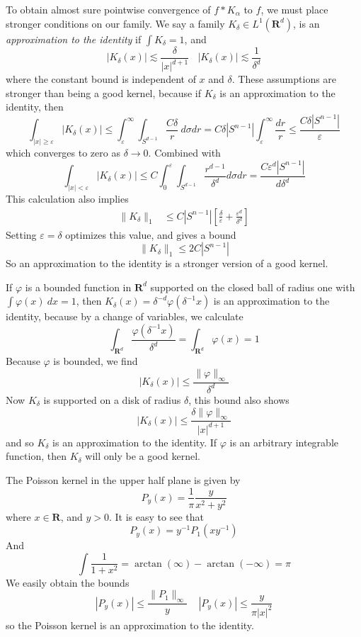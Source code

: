 To obtain almost sure pointwise convergence of $f * K_\alpha$ to $f$, we must place stronger conditions on our family. We say a family $K_\delta \in L^1(\mathbf{R}^d)$, is an \emph{approximation to the identity} if $\int K_\delta = 1$, and
%
\[ |K_\delta(x)| \lesssim \frac{\delta}{|x|^{d+1}}\ \ \ \ |K_\delta(x)| \lesssim \frac{1}{\delta^d} \]
%
where the constant bound is independent of $x$ and $\delta$. These assumptions are stronger than being a good kernel, because if $K_\delta$ is an approximation to the identity, then
%
\[ \int_{|x| \geq \varepsilon} |K_\delta(x)| \leq \int_\varepsilon^\infty \int_{S^{d-1}} \frac{C \delta}{r}\ d\sigma dr = C \delta |S^{n-1}| \int_\varepsilon^\infty \frac{dr}{r} \leq \frac{C \delta |S^{n-1}|}{\varepsilon} \]
%
which converges to zero as $\delta \to 0$. Combined with
%
\[ \int_{|x| < \varepsilon} |K_\delta(x)| \leq C \int_0^\varepsilon \int_{S^{d-1}} \frac{r^{d-1}}{\delta^d} d\sigma dr = \frac{C \varepsilon^d |S^{n-1}|}{d \delta^d} \]
%
This calculation also implies
%
\begin{align*}
    \| K_\delta \|_1 &\leq C |S^{n-1}| \left[ \frac{\delta}{\varepsilon} + \frac{\varepsilon^d}{\delta^d} \right]
\end{align*}
%
Setting $\varepsilon = \delta$ optimizes this value, and gives a bound
%
\[ \| K_\delta \|_1 \leq 2C |S^{n-1}| \]
%
So an approximation to the identity is a stronger version of a good kernel.

\begin{example}
    If $\varphi$ is a bounded function in $\mathbf{R}^d$ supported on the closed ball of radius one with $\int \varphi(x)\ dx = 1$, then $K_\delta(x) = \delta^{-d} \varphi(\delta^{-1}x)$ is an approximation to the identity, because by a change of variables, we calculate
    \[ \int_{\mathbf{R}^d} \frac{\varphi(\delta^{-1}x)}{\delta^d} = \int_{\mathbf{R}^d} \varphi(x) = 1 \]
    Because $\varphi$ is bounded, we find
    \[ |K_\delta(x)| \leq \frac{\| \varphi \|_\infty}{\delta^d} \]
    Now $K_\delta$ is supported on a disk of radius $\delta$, this bound also shows
    \[ |K_\delta(x)| \leq \frac{\delta \| \varphi \|_\infty}{|x|^{d+1}} \]
    and so $K_\delta$ is an approximation to the identity. If $\varphi$ is an arbitrary integrable function, then $K_\delta$ will only be a good kernel.
\end{example}

\begin{example}
    The Poisson kernel in the upper half plane is given by
    \[ P_y(x) = \frac{1}{\pi} \frac{y}{x^2 + y^2} \]
    where $x \in \mathbf{R}$, and $y > 0$. It is easy to see that
    \[ P_y(x) = y^{-1} P_1(xy^{-1}) \]
    And
    \[ \int \frac{1}{1 + x^2} = \arctan(\infty) - \arctan(-\infty) = \pi \]
    We easily obtain the bounds
    \[ |P_y(x)| \leq \frac{\| P_1 \|_\infty}{y}\ \ \ \ \ |P_y(x)| \leq \frac{y}{\pi |x|^2} \]
    so the Poisson kernel is an approximation to the identity.
\end{example}

